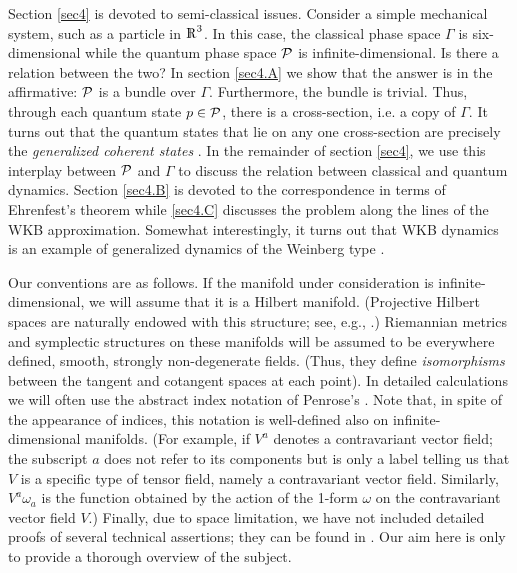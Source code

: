 \documentclass[12pt,aps,eqsecnum,tighten]{revtex4-2}
\def\P{{\cal P}}
\def\Rl{{\mathchoice 
{\setbox0=\hbox{$\displaystyle\rm R$}\hbox{\hbox to0pt
{\kern0.4\wd0\vrule height0.9\ht0\hss}\box0}}
{\setbox0=\hbox{$\textstyle\rm R$}\hbox{\hbox to0pt
{\kern0.4\wd0\vrule height0.9\ht0\hss}\box0}}
{\setbox0=\hbox{$\scriptstyle\rm R$}\hbox{\hbox to0pt
{\kern0.4\wd0\vrule height0.9\ht0\hss}\box0}}
{\setbox0=\hbox{$\scriptscriptstyle\rm R$}\hbox{\hbox to0pt
{\kern0.4\wd0\vrule height0.9\ht0\hss}\box0}}}}
\def\Rl{{\mathchoice
{\setbox0=\hbox{$\displaystyle\rm R$}\hbox{\hbox to0pt
{\kern0.4\wd0\vrule height0.9\ht0\hss}\box0}}
{\setbox0=\hbox{$\textstyle\rm R$}\hbox{\hbox to0pt
{\kern0.4\wd0\vrule height0.9\ht0\hss}\box0}}
{\setbox0=\hbox{$\scriptstyle\rm R$}\hbox{\hbox to0pt
{\kern0.4\wd0\vrule height0.9\ht0\hss}\box0}}
{\setbox0=\hbox{$\scriptscriptstyle\rm R$}\hbox{\hbox to0pt
{\kern0.4\wd0\vrule height0.9\ht0\hss}\box0}}}}
\def\R{\Rl}
\begin{document}
Section \ref{sec4} is devoted to semi-classical issues. Consider a
simple mechanical system, such as a particle in $\R^3$. In this case,
the classical phase space $\Gamma$ is six-dimensional while the
quantum phase space $\P$ is infinite-dimensional. Is there a relation
between the two? In section \ref{sec4.A} we show that the answer is in
the affirmative: $\P$ is a bundle over $\Gamma$. Furthermore, the
bundle is trivial. Thus, through each quantum state $p\in \P$, there
is a cross-section, i.e. a copy of $\Gamma$. It turns out that the
quantum states that lie on any one cross-section are precisely the
{\it generalized coherent states} \cite{perelomov,gilmore,klauder}. In
the remainder of section \ref{sec4}, we use this interplay between
$\P$ and $\Gamma$ to discuss the relation between classical and
quantum dynamics.  Section \ref{sec4.B} is devoted to the
correspondence in terms of Ehrenfest's theorem while \ref{sec4.C}
discusses the problem along the lines of the WKB
approximation. Somewhat interestingly, it turns out that WKB dynamics
is an example of generalized dynamics of the Weinberg type
\cite{weinberg}.

Our conventions are as follows. If the manifold under consideration is
infinite-dimensional, we will assume that it is a Hilbert
manifold. (Projective Hilbert spaces are naturally endowed with this
structure; see, e.g., \cite{thesis}.) Riemannian metrics and
symplectic structures on these manifolds will be assumed to be
everywhere defined, smooth, strongly non-degenerate fields. (Thus,
they define {\it isomorphisms} between the tangent and cotangent
spaces at each point). In detailed calculations we will often use the
abstract index notation of Penrose's \cite{rp2,indices}.  Note that,
in spite of the appearance of indices, this notation is well-defined
also on infinite-dimensional manifolds. (For example, if $V^a$ denotes
a contravariant vector field; the subscript $a$ does not refer to its
components but is only a label telling us that $V$ is a specific type
of tensor field, namely a contravariant vector field. Similarly,
$V^a\omega_a$ is the function obtained by the action of the 1-form
$\omega$ on the contravariant vector field $V$.)  Finally, due to
space limitation, we have not included detailed proofs of several
technical assertions; they can be found in \cite{thesis}. Our aim here
is only to provide a thorough overview of the subject.
\end{document}

